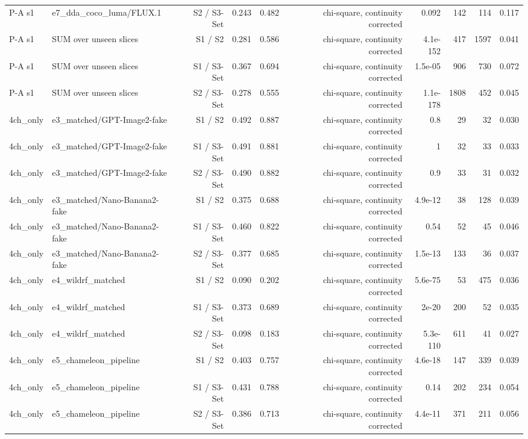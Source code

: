 \begin{table}[htbp]
\begin{tabular}{llrrrrrrrr}
P-A s1 & e7\_dda\_coco\_luma/FLUX.1 & S2 / S3-Set & 0.243 & 0.482 & chi-square, continuity corrected & 0.092 & 142 & 114 & 0.117 \\
P-A s1 & SUM over unseen slices & S1 / S2 & 0.281 & 0.586 & chi-square, continuity corrected & 4.1e-152 & 417 & 1597 & 0.041 \\
P-A s1 & SUM over unseen slices & S1 / S3-Set & 0.367 & 0.694 & chi-square, continuity corrected & 1.5e-05 & 906 & 730 & 0.072 \\
P-A s1 & SUM over unseen slices & S2 / S3-Set & 0.278 & 0.555 & chi-square, continuity corrected & 1.1e-178 & 1808 & 452 & 0.045 \\
4ch\_only & e3\_matched/GPT-Image2-fake & S1 / S2 & 0.492 & 0.887 & chi-square, continuity corrected & 0.8 & 29 & 32 & 0.030 \\
4ch\_only & e3\_matched/GPT-Image2-fake & S1 / S3-Set & 0.491 & 0.881 & chi-square, continuity corrected & 1 & 32 & 33 & 0.033 \\
4ch\_only & e3\_matched/GPT-Image2-fake & S2 / S3-Set & 0.490 & 0.882 & chi-square, continuity corrected & 0.9 & 33 & 31 & 0.032 \\
4ch\_only & e3\_matched/Nano-Banana2-fake & S1 / S2 & 0.375 & 0.688 & chi-square, continuity corrected & 4.9e-12 & 38 & 128 & 0.039 \\
4ch\_only & e3\_matched/Nano-Banana2-fake & S1 / S3-Set & 0.460 & 0.822 & chi-square, continuity corrected & 0.54 & 52 & 45 & 0.046 \\
4ch\_only & e3\_matched/Nano-Banana2-fake & S2 / S3-Set & 0.377 & 0.685 & chi-square, continuity corrected & 1.5e-13 & 133 & 36 & 0.037 \\
4ch\_only & e4\_wildrf\_matched & S1 / S2 & 0.090 & 0.202 & chi-square, continuity corrected & 5.6e-75 & 53 & 475 & 0.036 \\
4ch\_only & e4\_wildrf\_matched & S1 / S3-Set & 0.373 & 0.689 & chi-square, continuity corrected & 2e-20 & 200 & 52 & 0.035 \\
4ch\_only & e4\_wildrf\_matched & S2 / S3-Set & 0.098 & 0.183 & chi-square, continuity corrected & 5.3e-110 & 611 & 41 & 0.027 \\
4ch\_only & e5\_chameleon\_pipeline & S1 / S2 & 0.403 & 0.757 & chi-square, continuity corrected & 4.6e-18 & 147 & 339 & 0.039 \\
4ch\_only & e5\_chameleon\_pipeline & S1 / S3-Set & 0.431 & 0.788 & chi-square, continuity corrected & 0.14 & 202 & 234 & 0.054 \\
4ch\_only & e5\_chameleon\_pipeline & S2 / S3-Set & 0.386 & 0.713 & chi-square, continuity corrected & 4.4e-11 & 371 & 211 & 0.056 \\

\end{tabular}
\end{table}
